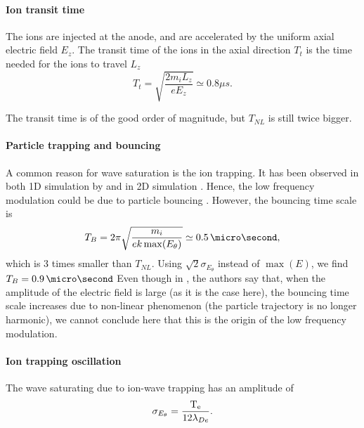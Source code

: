   
  \paragraph{Ion transit time\\}
    The ions are injected at the anode, and are accelerated by the uniform axial electric field $E_z$.
    The transit time of the ions in the axial direction $T_t$  is the time needed for the ions to travel $L_z$
    \begin{equation} \label{eq-transittime}
      T_{t} = \sqrt{\frac{2 m_i L_z}{e E_z}} \simeq 0.8 \mu s.
    \end{equation}
    
    The transit time is of the good  order of magnitude, but $T_{NL}$ is still twice bigger.
    
  \paragraph{Particle trapping and bouncing\\}
    A common reason for wave saturation is the ion trapping. 
    It has been observed in both \ac{1D} simulation by \citet{lafleur2016a} and in \ac{2D} simulation \citep{croes2017a}.
    Hence, the low frequency modulation could be due to particle bouncing \citep{belmont2013}.
    However, the bouncing time scale is 
    \begin{equation} \label{eq-TB}
      T_{B} = 2 \pi \sqrt{\frac{m_i}{e k \max(E_{\theta})} } \simeq 0.5 \,\micro\second,
    \end{equation}
    which is 3 times smaller than $T_{NL}$.
    Using $\sqrt{2} \sigma_{E_{\theta}}$ instead of $\max(E)$, we find $T_B = 0.9\,\micro\second$
    Even though in \citet{belmont2013}, the authors say that, when the amplitude of the electric field is large (as it is the case here), the bouncing time scale increases due to non-linear phenomenon (the particle trajectory is no longer harmonic), we cannot conclude here that this is the origin of the low frequency modulation.

  
  \paragraph{Ion trapping oscillation\\}
    The wave saturating due to ion-wave trapping has an amplitude of \citep{boeuf2018}
     \begin{equation} \label{eq-iontropempl}
       \sigma_{E_{\theta}} = \frac{\mathrm{T_e}}{12 \lambda_{De}}.
     \end{equation}
    
